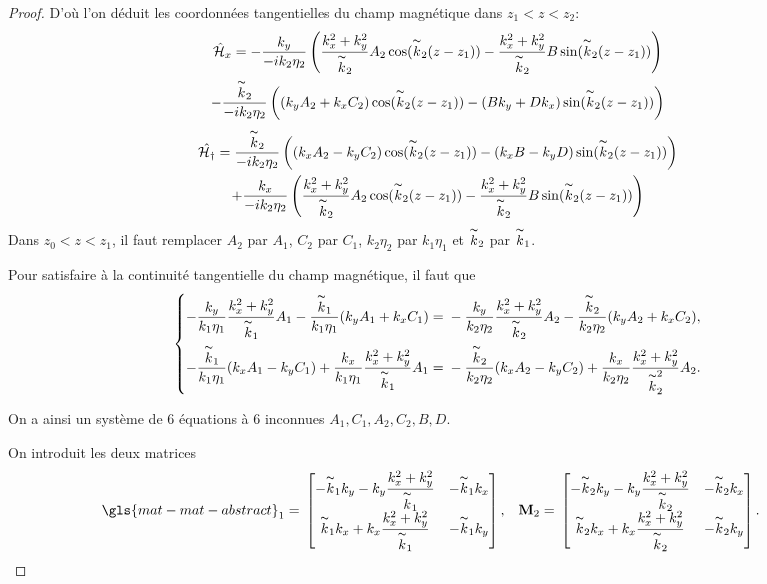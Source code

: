 \begin{proof}
    D'où l'on déduit les coordonnées tangentielles du champ magnétique dans \(z_1<z<z_2\):
    \begin{multline*}
    \hat{\mathcal{H}}_x = -\dfrac{k_y}{-ik_2\eta_2}\left(\dfrac{k_x^2+k_y^2}{\overset{\thicksim}{k}_2}A_2\cos(\overset{\thicksim}{k}_2(z-z_1))-\dfrac{k_x^2+k_y^2}{\overset{\thicksim}{k}_2}B\sin(\overset{\thicksim}{k}_2(z-z_1))\right)
    \\
    -\dfrac{\overset{\thicksim}{k}_2}{-ik_2\eta_2}\left((k_yA_2+k_xC_2)\cos(\overset{\thicksim}{k}_2(z-z_1))-(Bk_y+Dk_x)\sin(\overset{\thicksim}{k}_2(z-z_1))\right)
    \end{multline*}
    \begin{multline*}
    \hat{\mathcal{H_y}} = \dfrac{\overset{\thicksim}{k}_2}{-ik_2\eta_2}\left((k_xA_2-k_yC_2)\cos(\overset{\thicksim}{k}_2(z-z_1))-(k_xB-k_yD)\sin(\overset{\thicksim}{k}_2(z-z_1))\right)
    \\
    +\dfrac{k_x}{-ik_2\eta_2}\left(\dfrac{k_x^2+k_y^2}{\overset{\thicksim}{k}_2}A_2\cos(\overset{\thicksim}{k}_2(z-z_1))-\dfrac{k_x^2+k_y^2}{\overset{\thicksim}{k}_2}B\sin(\overset{\thicksim}{k}_2(z-z_1))\right)
    \end{multline*}
    Dans \(z_0<z<z_1\), il faut remplacer \(A_2\) par \(A_1\), \(C_2\) par \(C_1\), \(k_2\eta_2\) par \(k_1\eta_1\) et \(\overset{\thicksim}{k}_2\) par \(\overset{\thicksim}{k}_1\).


    Pour satisfaire à la continuité tangentielle du champ magnétique, il faut que
    \[
    \left\{
    \begin{aligned}
    -\dfrac{k_y}{k_1\eta_1}\dfrac{k_x^2+k_y^2}{\overset{\thicksim}{k}_1}A_1-\dfrac{\overset{\thicksim}{k}_1}{k_1\eta_1}(k_yA_1+k_xC_1)={}&-\dfrac{k_y}{k_2\eta_2}\dfrac{k_x^2+k_y^2}{\overset{\thicksim}{k}_2}A_2-\dfrac{\overset{\thicksim}{k}_2}{k_2\eta_2}(k_yA_2+k_xC_2),
    \\
    -\dfrac{\overset{\thicksim}{k}_1}{k_1\eta_1}(k_xA_1-k_yC_1)+\dfrac{k_x}{k_1\eta_1}\dfrac{k_x^2+k_y^2}{\overset{\thicksim}{k}_1}A_1={}&-\dfrac{\overset{\thicksim}{k}_2}{k_2\eta_2}(k_xA_2-k_yC_2)+\dfrac{k_x}{k_2\eta_2}\dfrac{k_x^2+k_y^2}{\overset{\thicksim}{k}_2^2}A_2.
    \end{aligned}
    \right.
    \]

    On a ainsi un système de 6 équations à 6 inconnues \(A_1,C_1,A_2,C_2,B,D\).

    On introduit les deux matrices
    \begin{align*}
    \gls{mat-mat-abstract}_1={}&
    \begin{bmatrix}
    -\kk_1k_y-k_y\frac{k_x^2+k_y^2}{\kk_1}  &   -\kk_1k_x
    \cr
    \kk_1k_x+k_x\frac{k_x^2+k_y^2}{\kk_1}   &   -\kk_1k_y
    \end{bmatrix},
    &
    \mM_2={}&
    \begin{bmatrix}
    -\kk_2k_y-k_y\frac{k_x^2+k_y^2}{\kk_2}  &   -\kk_2k_x
    \cr
    \kk_2k_x+k_x\frac{k_x^2+k_y^2}{\kk_2}   &   -\kk_2k_y
    \end{bmatrix}.
    \end{align*}


\end{proof}
